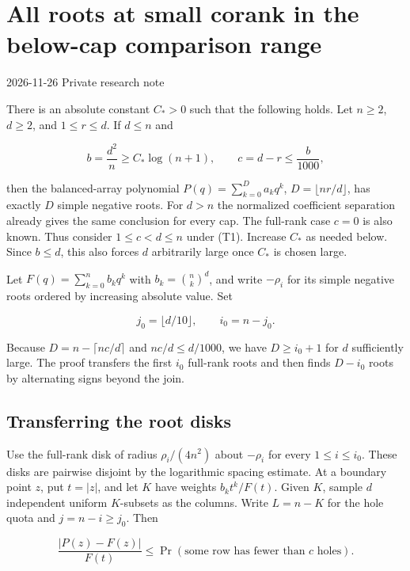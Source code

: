 \section{All roots at small corank in the below-cap comparison range}\label{sec:small-corank-subquadratic}

2026-11-26 \enspace Private research note

There is an absolute constant $C_*>0$ such that the following holds. Let $n\ge2$, $d\ge2$, and $1\le r\le d$. If $d\le n$ and

\begin{equation}
b=\frac{d^2}{n}\ge C_*\log(n+1),
\qquad
c=d-r\le\frac{b}{1000},
\tag{T1}
\end{equation}

then the balanced-array polynomial $P(q)=\sum_{k=0}^D a_kq^k$, $D=\lfloor nr/d\rfloor$, has exactly $D$ simple negative roots. For $d>n$ the normalized coefficient separation already gives the same conclusion for every cap. The full-rank case $c=0$ is also known. Thus consider $1\le c<d\le n$ under (T1). Increase $C_*$ as needed below. Since $b\le d$, this also forces $d$ arbitrarily large once $C_*$ is chosen large.

Let $F(q)=\sum_{k=0}^n b_kq^k$ with $b_k=\binom nk^d$, and write $-\rho_i$ for its simple negative roots ordered by increasing absolute value. Set

\begin{equation*}
j_0=\lfloor d/10\rfloor,\qquad i_0=n-j_0.
\end{equation*}

Because $D=n-\lceil nc/d\rceil$ and $nc/d\le d/1000$, we have $D\ge i_0+1$ for $d$ sufficiently large. The proof transfers the first $i_0$ full-rank roots and then finds $D-i_0$ roots by alternating signs beyond the join.

\subsection{Transferring the root disks}

Use the full-rank disk of radius $\rho_i/(4n^2)$ about $-\rho_i$ for every $1\le i\le i_0$. These disks are pairwise disjoint by the logarithmic spacing estimate. At a boundary point $z$, put $t=|z|$, and let $K$ have weights $b_k t^k/F(t)$. Given $K$, sample $d$ independent uniform $K$-subsets as the columns. Write $L=n-K$ for the hole quota and $j=n-i\ge j_0$. Then

\begin{equation}
\frac{|P(z)-F(z)|}{F(t)}
\le \Pr(\text{some row has fewer than }c\text{ holes}).
\tag{T2}
\end{equation}


